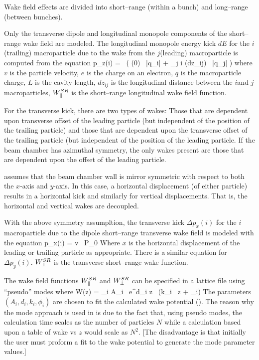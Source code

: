 Wake field effects are divided into short--range (within a bunch) and
long--range (between bunches).

Only the transverse dipole and longitudinal monopole components of the
short--range wake field are modeled. The longitudinal monopole energy
kick $dE$ for the $i$\Th (trailing) macroparticle due to the wake from
the $j$\Th (leading) macroparticle is computed from the equation
\Begineq
  \Delta p_z(i) =  \, \left(
        \WlS(0) \,  |q_i| +
        \sum_{j \ne i} \WlS(dz_{ij}) \, |q_j| \right)
  \label{delvp}
\Endeq
where $v$ is the particle velocity, $e$ is the charge on an electron,
$q$ is the macroparticle charge, $L$ is the cavity length, $dz_{ij}$
is the longitudinal distance between the $i$\Th and $j$\Th
macroparticles, $W^{SR}_\parallel$ is the short--range longitudinal wake field
function.

For the transverse kick, there are two types of wakes: Those that are
dependent upon transverse offset of the leading particle (but
independent of the position of the trailing particle) and those that
are dependent upon the transverse offset of the trailing particle (but
independent of the position of the leading particle. If the beam
chamber has azimuthal symmetry, the only wakes present are those that
are dependent upon the offset of the leading particle. 

\bmad assumes that the beam chamber wall is mirror symmetric with
respect to both the $x$-axis and $y$-axis. In this case, a horizontal
displacement (of either particle) results in a horizontal kick and
similarly for vertical displacements. That is, the horizontal and
vertical wakes are decoupled. 

With the above symmetry assumpltion, 
the transverse kick $\Delta p_x(i)$ for the $i$\Th macroparticle due to the 
dipole short--range transverse wake field is modeled with the equation
\Begineq
  \Delta p_x(i) = 
                 {v \, P_0}
  \label{pelqxw}
\Endeq
Where $x$ is the horizontal displacement of the leading or trailing
particle as appropriate. There is a similar equation for $\Delta
p_y(i)$. $W^{SR}_\perp$ is the transverse short--range wake function.

The wake field functions $W^{SR}_\parallel$ and $W^{SR}_\perp$ can be specified in a \bmad
lattice file using ``pseudo'' modes where
\Begineq
  W(z) = \sum_i A_i \, e^{d_i z} \, \sin (k_i \, z + \phi_i)
  \label{wadzk}
\Endeq
The parameters $(A_i, d_i, k_i, \phi_i)$ are chosen to fit the
calculated wake potential (). The reason
why the mode approach is used in \bmad is due to the fact that, using
pseudo modes, the calculation time scales as the number of particles
$N$ while a calculation based upon a table of wake vs $z$ would scale
as $N^2$. [The disadvantage is that initially the user must proform a
fit to the wake potential to generate the mode parameter values.]

